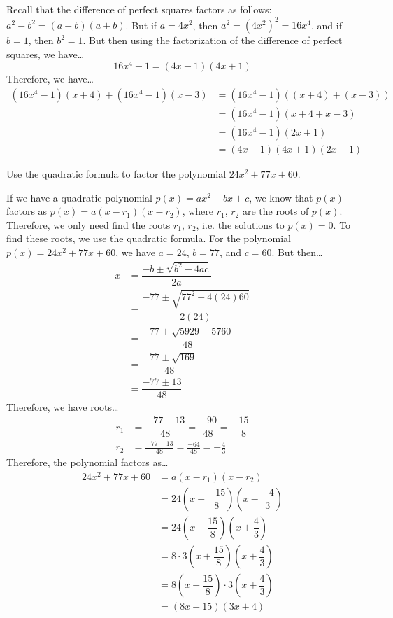 \documentclass[12pt,letterpaper]{exam}
\begin{document}
\begin{questions}
\sol Recall that the difference of perfect squares factors as follows: $a^2 - b^2= (a - b)(a + b)$. But if $a= 4x^2$, then $a^2= (4x^2)^2= 16x^4$, and if $b= 1$, then $b^2= 1$. But then using the factorization of the difference of perfect squares, we have\dots
	\[
	16x^4 - 1= (4x - 1)(4x + 1)
	\]
Therefore, we have\dots
	\[
	\begin{aligned}
	(16x^4 - 1)(x + 4) + (16x^4 - 1)(x - 3)&= (16x^4 - 1) \left( (x + 4) + (x - 3) \right) \\[0.3cm]
	&= (16x^4 - 1)(x + 4 + x - 3) \\[0.3cm]
	&= (16x^4 - 1)(2x + 1) \\[0.3cm]
	&= (4x - 1)(4x + 1)(2x + 1)
	\end{aligned}
	\]



\newpage
\question[10] Use the quadratic formula to factor the polynomial $24x^2 + 77x + 60$. \pspace

\sol If we have a quadratic polynomial $p(x)= ax^2 + bx + c$, we know that $p(x)$ factors as $p(x)= a(x - r_1)(x - r_2)$, where $r_1$, $r_2$ are the roots of $p(x)$. Therefore, we only need find the roots $r_1$, $r_2$, i.e. the solutions to $p(x)= 0$. To find these roots, we use the quadratic formula. For the polynomial $p(x)= 24x^2 + 77x + 60$, we have $a= 24$, $b= 77$, and $c= 60$. But then\dots
	\[
	\begin{aligned}
	x&= \dfrac{-b \pm \sqrt{b^2 - 4ac}}{2a} \\[0.3cm]
	&= \dfrac{-77 \pm \sqrt{77^2 - 4(24)60}}{2(24)} \\[0.3cm]
	&= \dfrac{-77 \pm \sqrt{5929 - 5760}}{48} \\[0.3cm]
	&= \dfrac{-77 \pm \sqrt{169}}{48} \\[0.3cm]
	&= \dfrac{-77 \pm 13}{48}
	\end{aligned}
	\]
Therefore, we have roots\dots
	\[
	\begin{aligned}
	r_1&= \dfrac{-77 - 13}{48}= \dfrac{-90}{48}= -\dfrac{15}{8} \\[0.3cm]
	r_2&= \frac{-77 + 13}{48}= \frac{-64}{48}= -\frac{4}{3}
	\end{aligned}
	\]
Therefore, the polynomial factors as\dots
	\[
	\begin{aligned}
	24x^2 + 77x + 60&= a(x - r_1)(x - r_2) \\[0.3cm]
	&= 24 \left(x - \dfrac{-15}{8} \right) \left(x - \dfrac{-4}{3} \right) \\[0.3cm]
	&= 24 \left(x + \dfrac{15}{8} \right) \left(x + \dfrac{4}{3} \right) \\[0.3cm]
	&= 8 \cdot 3 \left(x + \dfrac{15}{8} \right) \left(x + \dfrac{4}{3} \right) \\[0.3cm]
	&= 8 \left(x + \dfrac{15}{8} \right) \cdot 3 \left(x + \dfrac{4}{3} \right) \\[0.3cm]
	&= (8x + 15) (3x + 4)
	\end{aligned}
	\]




\end{questions}
\end{document}

